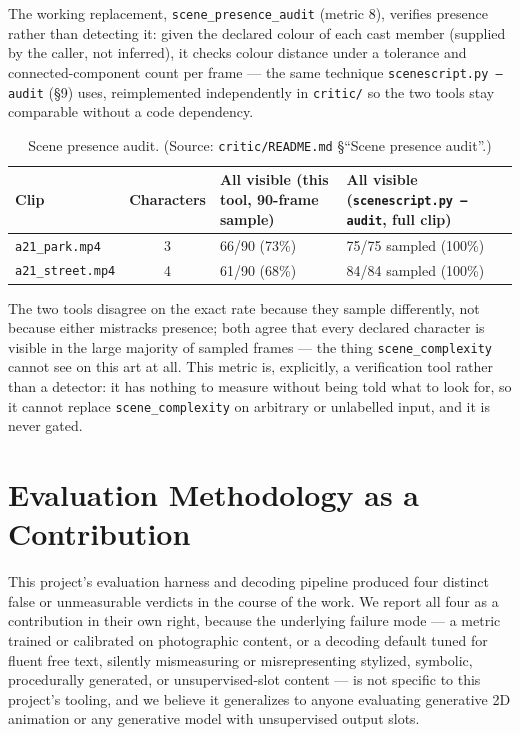 \documentclass[11pt]{article}
\newcommand{\secsym}{\S}
\begin{document}
The working replacement, \texttt{scene\_presence\_audit} (metric 8),
verifies presence rather than detecting it: given the declared colour of
each cast member (supplied by the caller, not inferred), it checks colour
distance under a tolerance and connected-component count per frame --- the
same technique \texttt{scenescript.py --audit} (\secsym9) uses,
reimplemented independently in \texttt{critic/} so the two tools stay
comparable without a code dependency.

\begin{table}[h]
\centering
\caption{Scene presence audit. (Source: \texttt{critic/README.md}
\secsym``Scene presence audit''.)}
\label{tab:presenceaudit}
\begin{tabular}{@{}lcL{4cm}L{4cm}@{}}
\toprule
Clip & Characters & All visible (this tool, 90-frame sample) & All visible
  (\texttt{scenescript.py --audit}, full clip) \\
\midrule
\texttt{a21\_park.mp4} & 3 & 66/90 (73\%) & 75/75 sampled (100\%) \\
\texttt{a21\_street.mp4} & 4 & 61/90 (68\%) & 84/84 sampled (100\%) \\
\bottomrule
\end{tabular}
\end{table}

The two tools disagree on the exact rate because they sample differently,
not because either mistracks presence; both agree that every declared
character is visible in the large majority of sampled frames --- the
thing \texttt{scene\_complexity} cannot see on this art at all. This
metric is, explicitly, a verification tool rather than a detector: it has
nothing to measure without being told what to look for, so it cannot
replace \texttt{scene\_complexity} on arbitrary or unlabelled input, and
it is never gated.

\section{Evaluation Methodology as a Contribution}
\label{sec:evalmethodology}

This project's evaluation harness and decoding pipeline produced four
distinct false or unmeasurable verdicts in the course of the work. We
report all four as a contribution in their own right, because the
underlying failure mode --- a metric trained or calibrated on
photographic content, or a decoding default tuned for fluent free text,
silently mismeasuring or misrepresenting stylized, symbolic, procedurally
generated, or unsupervised-slot content --- is not specific to this
project's tooling, and we believe it generalizes to anyone evaluating
generative 2D animation or any generative model with unsupervised output
slots.
\end{document}
